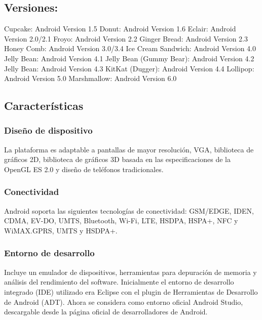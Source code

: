 \documentclass{bmcart}
\begin{document}
\subsection*{Versiones:}
Cupcake: Android Version 1.5\newline
Donut: Android Version 1.6 \newline
Eclair: Android Version 2.0/2.1 \newline
Froyo: Android Version 2.2\newline
Ginger Bread: Android Version 2.3 \newline
Honey Comb: Android Version 3.0/3.4\newline
Ice Cream Sandwich: Android Version 4.0 \newline
Jelly Bean: Android Version 4.1 \newline
Jelly Bean (Gummy Bear): Android Version 4.2 \newline
Jelly Bean: Android Version 4.3 \newline
KitKat (Dugger): Android Version 4.4 \newline
Lollipop: Android Version 5.0\newline
Marshmallow: Android Version 6.0

\newpage
\subsection*{Características}

\subsubsection*{Diseño de dispositivo}
La plataforma es adaptable a pantallas de mayor resolución, VGA, biblioteca de gráficos 2D, biblioteca de gráficos 3D basada en las especificaciones de la OpenGL ES 2.0 y diseño de teléfonos tradicionales.

\subsubsection*{Conectividad}
Android soporta las siguientes tecnologías de conectividad: GSM/EDGE, IDEN, CDMA, EV-DO, UMTS, Bluetooth, Wi-Fi, LTE, HSDPA, HSPA+, NFC y WiMAX.GPRS, UMTS y HSDPA+.

\subsubsection*{Entorno de desarrollo}

Incluye un emulador de dispositivos, herramientas para depuración de memoria y análisis del rendimiento del software. Inicialmente el entorno de desarrollo integrado (IDE) utilizado era Eclipse con el plugin de Herramientas de Desarrollo de Android (ADT). Ahora se considera como entorno oficial Android Studio, descargable desde la página oficial de desarrolladores de Android.
\end{document}
